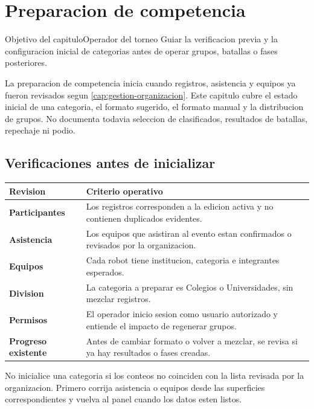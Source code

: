 \chapter{Preparacion de competencia}
\label{cap:preparacion-competencia}

\begin{procedimiento}{Objetivo del capitulo}{Operador del torneo}
Guiar la verificacion previa y la configuracion inicial de categorias antes de operar grupos, batallas o fases posteriores.
\end{procedimiento}

La preparacion de competencia inicia cuando registros, asistencia y equipos ya fueron revisados segun \cref{cap:gestion-organizacion}. Este capitulo cubre el estado inicial de una categoria, el formato sugerido, el formato manual y la distribucion de grupos. No documenta todavia seleccion de clasificados, resultados de batallas, repechaje ni podio.

\section{Verificaciones antes de inicializar}

\begin{tabularx}{\linewidth}{>{\bfseries}p{4.2cm}X}
\toprule
Revision & Criterio operativo\\
\midrule
Participantes & Los registros corresponden a la edicion activa y no contienen duplicados evidentes.\\
Asistencia & Los equipos que asistiran al evento estan confirmados o revisados por la organizacion.\\
Equipos & Cada robot tiene institucion, categoria e integrantes esperados.\\
Division & La categoria a preparar es Colegios o Universidades, sin mezclar registros.\\
Permisos & El operador inicio sesion como usuario autorizado y entiende el impacto de regenerar grupos.\\
Progreso existente & Antes de cambiar formato o volver a mezclar, se revisa si ya hay resultados o fases creadas.\\
\bottomrule
\end{tabularx}

\begin{advertencia}
No inicialice una categoria si los conteos no coinciden con la lista revisada por la organizacion. Primero corrija asistencia o equipos desde las superficies correspondientes y vuelva al panel cuando los datos esten listos.
\end{advertencia}

